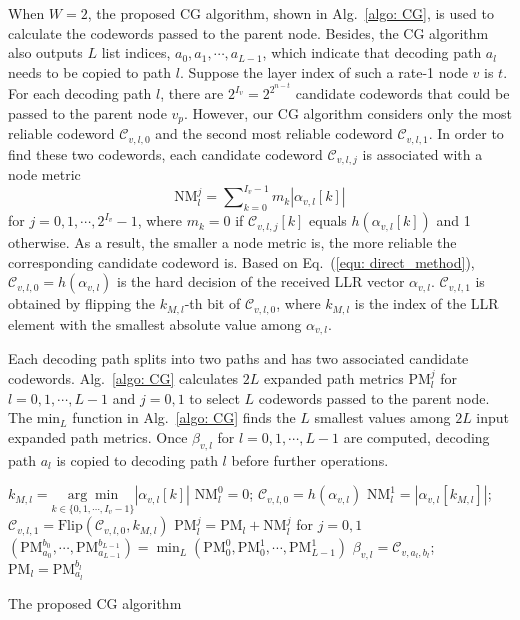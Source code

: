 \documentclass[journal]{IEEEtran}
\begin{document}
When $W=2$, the proposed CG algorithm, shown in Alg.~\ref{algo: CG}, is used to calculate the codewords passed to the parent node. Besides, the CG algorithm also outputs $L$ list indices, $a_0, a_1,\cdots,a_{L-1}$, which indicate that decoding path $a_l$ needs to be copied to path $l$. Suppose the layer index of such a rate-1 node $v$ is $t$. For each decoding path $l$, there are $2^{I_v} = 2^{2^{n-t}}$ candidate codewords that could be passed to the parent node $v_p$. However, our CG algorithm considers only the most reliable codeword $\mathcal{C}_{v,l,0}$ and the second most reliable codeword $\mathcal{C}_{v,l,1}$. In order to find these two codewords, each candidate codeword $\mathcal{C}_{v,l,j}$ is associated with a node metric
\begin{equation}\label{equ: direct_method}
\mbox{NM}_l^j = \sum\nolimits_{k=0}^{I_v-1}m_k|\alpha_{v,l}[k]|
\end{equation}
for $j=0,1,\cdots,2^{I_v}-1$, where $m_k=0$ if $\mathcal{C}_{v,l,j}[k]$ equals $h(\alpha_{v,l}[k])$ and 1 otherwise. As a result, the smaller a node metric is, the more reliable the corresponding candidate codeword is. Based on Eq.~(\ref{equ: direct_method}), $\mathcal{C}_{v,l,0} = h(\alpha_{v,l})$ is the hard decision of the received LLR vector $\alpha_{v,l}$. $\mathcal{C}_{v,l,1}$ is obtained by flipping the $k_{M,l}$-th bit of $\mathcal{C}_{v,l,0}$, where $k_{M,l}$ is the index of the LLR element with the smallest absolute value among $\alpha_{v,l}$.


Each decoding path splits into two paths and has two associated candidate codewords. Alg.~\ref{algo: CG} calculates $2L$ expanded path metrics PM$_l^j$ for $l=0,1,\cdots,L-1$ and $j=0,1$ to select $L$ codewords passed to the parent node. The min$_L$ function in Alg.~\ref{algo: CG} finds the $L$ smallest values among $2L$ input expanded path metrics. Once $\beta_{v,l}$ for $l=0,1,\cdots,L-1$ are computed, decoding path $a_l$ is copied to decoding path $l$ before further operations.

\begin{algorithm}
\DontPrintSemicolon
\label{algo: CG}

\BlankLine

 {
$k_{M,l} = \underset{k\in\{0,1,\cdots,I_v-1\}}{\arg\!\min}|\alpha_{v,l}[k]|$\;
$\mbox{NM}_l^0 = 0$; $\mathcal{C}_{v,l,0} = h(\alpha_{v,l})$\;
$\mbox{NM}_l^1 = |\alpha_{v,l}[k_{M,l}]|$; $\mathcal{C}_{v,l,1} = \mbox{Flip}(\mathcal{C}_{v,l,0}, k_{M,l})$\;
$\mbox{PM}_l^j = \mbox{PM}_l + \mbox{NM}_l^j$ for $j=0,1$\;
}
$(\mbox{PM}_{a_0}^{b_0}, \cdots,\mbox{PM}_{a_{L-1}}^{b_{L-1}}) = \min_L(\mbox{PM}_0^0, \mbox{PM}_0^1,\cdots,\mbox{PM}_{L-1}^1)$
 {
$\beta_{v,l} = \mathcal{C}_{v,a_l,b_l}$; $\mbox{PM}_l = \mbox{PM}_{a_l}^{b_l}$\;
}
\caption{The proposed CG algorithm}
\end{algorithm}
\end{document}
